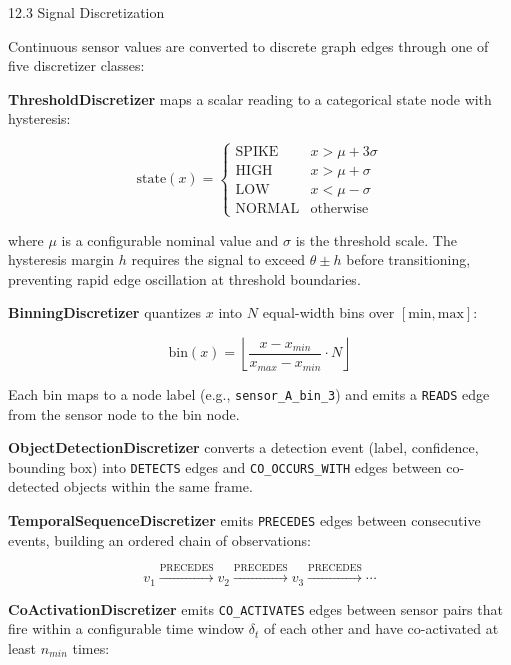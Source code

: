 \documentclass[10pt,journal,compsoc]{IEEEtran}
\begin{document}
12.3 Signal Discre\-tization

Continuous sensor values are converted to discrete graph edges through one of five discretizer classes:

\textbf{ThresholdDiscre\-tizer} maps a scalar reading to a categorical state node with hysteresis:

\begin{equation}
\text{state}(x) = \begin{cases} \text{SPIKE} & x > \mu + 3\sigma \\ \text{HIGH} & x > \mu + \sigma \\ \text{LOW} & x < \mu - \sigma \\ \text{NORMAL} & \text{otherwise} \end{cases}
\end{equation}

where $\mu$ is a confi\-gurable nominal value and $\sigma$ is the threshold scale. The hysteresis margin $h$ requires the signal to exceed $\theta \pm h$ before trans\-itioning, preventing rapid edge oscillation at threshold boundaries.

\textbf{BinningDiscre\-tizer} quantizes $x$ into $N$ equal-width bins over $[\text{min}, \text{max}]$:

\begin{equation}
\text{bin}(x) = \left\lfloor \frac{x - x_{min}}{x_{max} - x_{min}} \cdot N \right\rfloor
\end{equation}

Each bin maps to a node label (e.g., \texttt{sensor\_A\_bin\_3}) and emits a \texttt{READS} edge from the sensor node to the bin node.

\textbf{ObjectDetectionDiscre\-tizer} converts a detection event (label, confidence, bounding box) into \texttt{DETECTS} edges and \texttt{CO\_OCCURS\_WITH} edges between co-detected objects within the same frame.

\textbf{TemporalSequenceDiscre\-tizer} emits \texttt{PRECEDES} edges between consecutive events, building an ordered chain of obser\-vations:

\begin{equation}
v_1 \xrightarrow{\text{PRECEDES}} v_2 \xrightarrow{\text{PRECEDES}} v_3 \xrightarrow{\text{PRECEDES}} \cdots
\end{equation}

\textbf{CoActivationDiscre\-tizer} emits \texttt{CO\_ACTIVATES} edges between sensor pairs that fire within a confi\-gurable time window $\delta_t$ of each other and have co-activated at least $n_{min}$ times:
\end{document}
